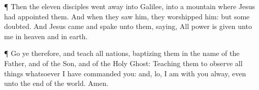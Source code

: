  ¶ Then the eleven disciples went away into Galilee, into a
mountain where Jesus had appointed them.  And when they saw
him, they worshipped him: but some doubted.  And Jesus came
and spake unto them, saying, All power is given unto me in heaven and in
earth.

 ¶ Go ye therefore, and teach all nations, baptizing them
in the name of the Father, and of the Son, and of the Holy Ghost:
 Teaching them to observe all things whatsoever I have
commanded you: and, lo, I am with you alway, even unto the end of the
world. Amen.
